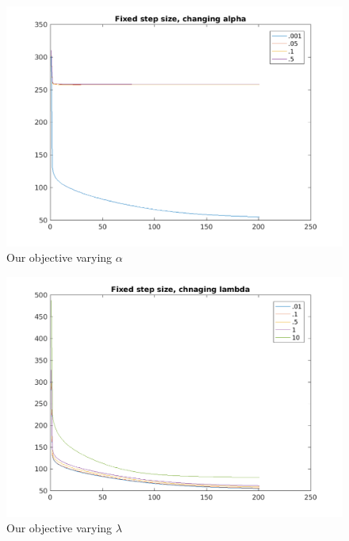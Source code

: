 \documentclass{article}
\newcommand{\0}{\mathrm{0}}
\newcommand{\1}{\mathrm{1}}
\begin{document}
\iffalse
\begin{figure}
  \includegraphics[width=\textwidth]{fixed-step-alpha.png}
  \caption{Our objective varying $\alpha$}
\end{figure}

\begin{figure}
  \includegraphics[width=\textwidth]{fixed-step-lambda.png}
  \caption{Our objective varying $\lambda$}
\end{figure}
\end{document}
